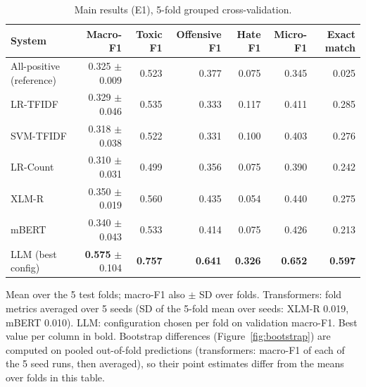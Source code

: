 \begin{table}[htbp]
\centering
\caption{Main results (E1), 5-fold grouped cross-validation.}
\label{tab:main}
\begin{tabular}{lrrrrrr}
\toprule
System & Macro-F1 & Toxic F1 & Offensive F1 & Hate F1 & Micro-F1 & Exact match \\
\midrule
All-positive (reference) & 0.325 $\pm$ 0.009 & 0.523 & 0.377 & 0.075 & 0.345 & 0.025 \\
LR-TFIDF & 0.329 $\pm$ 0.046 & 0.535 & 0.333 & 0.117 & 0.411 & 0.285 \\
SVM-TFIDF & 0.318 $\pm$ 0.038 & 0.522 & 0.331 & 0.100 & 0.403 & 0.276 \\
LR-Count & 0.310 $\pm$ 0.031 & 0.499 & 0.356 & 0.075 & 0.390 & 0.242 \\
\midrule
XLM-R & 0.350 $\pm$ 0.019 & 0.560 & 0.435 & 0.054 & 0.440 & 0.275 \\
mBERT & 0.340 $\pm$ 0.043 & 0.533 & 0.414 & 0.075 & 0.426 & 0.213 \\
\midrule
LLM (best config) & \textbf{0.575} $\pm$ 0.104 & \textbf{0.757} & \textbf{0.641} & \textbf{0.326} & \textbf{0.652} & \textbf{0.597} \\
\bottomrule
\end{tabular}
\par\smallskip\footnotesize Mean over the 5 test folds; macro-F1 also $\pm$ SD over folds. Transformers: fold metrics averaged over 5 seeds (SD of the 5-fold mean over seeds: XLM-R 0.019, mBERT 0.010). LLM: configuration chosen per fold on validation macro-F1. Best value per column in bold. Bootstrap differences (Figure~\ref{fig:bootstrap}) are computed on pooled out-of-fold predictions (transformers: macro-F1 of each of the 5 seed runs, then averaged), so their point estimates differ from the means over folds in this table.
\end{table}
